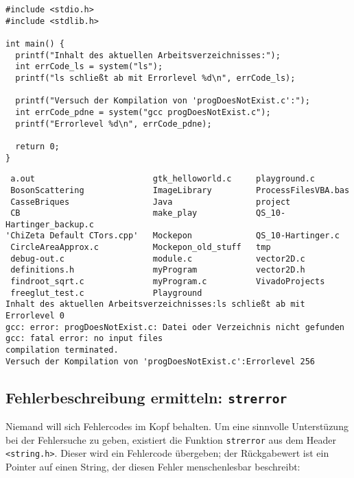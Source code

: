 \begin{codebox}
\begin{verbatim}
#include <stdio.h>
#include <stdlib.h>
 
int main() {
  printf("Inhalt des aktuellen Arbeitsverzeichnisses:");
  int errCode_ls = system("ls");
  printf("ls schließt ab mit Errorlevel %d\n", errCode_ls);

  printf("Versuch der Kompilation von 'progDoesNotExist.c':");
  int errCode_pdne = system("gcc progDoesNotExist.c");
  printf("Errorlevel %d\n", errCode_pdne);
  
  return 0;
}
\end{verbatim}
\end{codebox}

\begin{cmdbox}
\begin{verbatim}
 a.out                        gtk_helloworld.c     playground.c
 BosonScattering              ImageLibrary         ProcessFilesVBA.bas
 CasseBriques                 Java                 project
 CB                           make_play            QS_10-Hartinger_backup.c
'ChiZeta Default CTors.cpp'   Mockepon             QS_10-Hartinger.c
 CircleAreaApprox.c           Mockepon_old_stuff   tmp
 debug-out.c                  module.c             vector2D.c
 definitions.h                myProgram            vector2D.h
 findroot_sqrt.c              myProgram.c          VivadoProjects
 freeglut_test.c              Playground
Inhalt des aktuellen Arbeitsverzeichnisses:ls schließt ab mit Errorlevel 0
gcc: error: progDoesNotExist.c: Datei oder Verzeichnis nicht gefunden
gcc: fatal error: no input files
compilation terminated.
Versuch der Kompilation von 'progDoesNotExist.c':Errorlevel 256
\end{verbatim}
\end{cmdbox}


\subsection{Fehlerbeschreibung ermitteln: \texttt{strerror}}
Niemand will sich Fehlercodes im Kopf behalten. Um eine sinnvolle Unterstüzung bei der Fehlersuche zu geben, existiert die Funktion \texttt{strerror} aus dem Header \texttt{<string.h>}. Dieser wird ein Fehlercode übergeben; der Rückgabewert ist ein Pointer auf einen String, der diesen Fehler menschenlesbar beschreibt:

